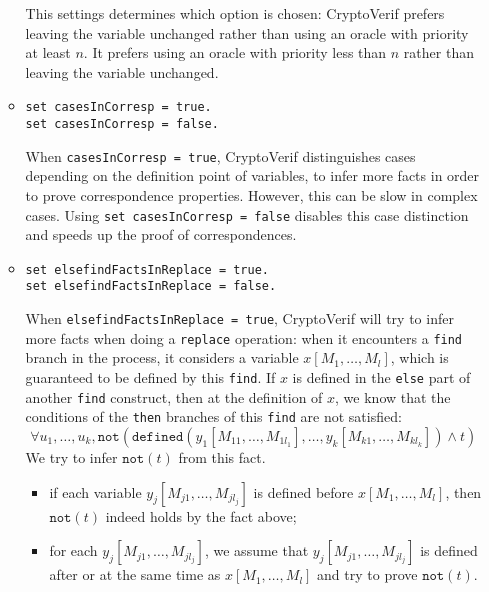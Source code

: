 \begin{itemize}
\begin{itemize}
This settings determines which option is chosen: CryptoVerif prefers
leaving the variable unchanged rather than using an oracle with
priority at least $n$. It prefers using an oracle with priority
less than $n$ rather than leaving the variable unchanged.

\item \texttt{set casesInCorresp = true.}\\
\texttt{set casesInCorresp = false.}

When \texttt{casesInCorresp = true}, CryptoVerif distinguishes
cases depending on the definition point of variables, to infer
more facts in order to prove correspondence properties.
However, this can be slow in complex cases. Using
\texttt{set casesInCorresp = false} disables this case
distinction and speeds up the proof of correspondences.

% 

\item \texttt{set elsefindFactsInReplace = true.}\\
\texttt{set elsefindFactsInReplace = false.}

When \texttt{elsefindFactsInReplace = true}, CryptoVerif will try to
infer more facts when doing a \texttt{replace} operation: when it
encounters a \texttt{find} branch in the process, it considers a
variable $x[M_1, \ldots, M_l]$, which is guaranteed to be defined by this \texttt{find}.
If $x$ is defined in the \texttt{else} part of another \texttt{find}
construct, then at the definition of $x$, we know that the conditions
of the \texttt{then} branches of this \texttt{find} are not satisfied:
\[\forall u_1, \ldots, u_k, \texttt{not}(\texttt{defined}(y_1[M_{11}, \ldots, M_{1l_1}], \ldots, y_k[M_{k1}, \ldots, M_{kl_k}]) \wedge t)\]
We try to infer $\texttt{not}(t)$ from this fact.
\begin{itemize}
\item if each variable $y_j[M_{j1}, \ldots, M_{jl_j}]$ is defined before $x[M_1, \ldots, M_l]$,
then $\texttt{not}(t)$ indeed holds by the fact above;
\item for each $y_j[M_{j1}, \ldots, M_{jl_j}]$, 
we assume that $y_j[M_{j1}, \ldots, M_{jl_j}]$ is defined after or at the same time as $x[M_1, \ldots, M_l]$
and try to prove $\texttt{not}(t)$.


\end{itemize}
\end{itemize}
\end{itemize}
